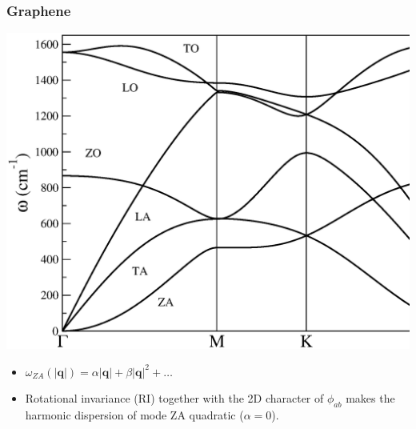 \documentclass{beamer}
\begin{document}

\begin{frame}

\frametitle{Graphene}
 \begin{center}
 \includegraphics[width=0.7\linewidth]{Pictures/Graphene/phonon-harmonic.eps}
\end{center}
\begin{itemize}
 \item $\omega_{ZA}(|\boldsymbol{q}|)=\alpha|\boldsymbol{q}|+\beta|\boldsymbol{q}|^{2}+\dots$
 \item Rotational invariance (RI) together with the 2D character of $\phi_{ab}$ makes the harmonic dispersion of mode ZA quadratic ($\alpha=0$).
\end{itemize}

\end{frame}

\end{document}
